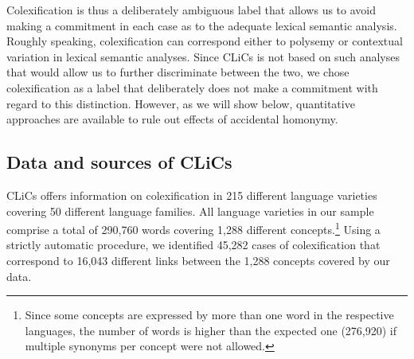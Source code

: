 Colexification is thus a deliberately ambiguous label that allows us to avoid making a commitment in
each case as to the adequate lexical semantic analysis.
Roughly speaking,
colexification can correspond either to polysemy or contextual variation in lexical semantic analyses.
Since CLiCs is not based on such analyses that would allow us to further discriminate between the
two, we chose colexification as a label that deliberately does not make a commitment with regard to
this distinction. However, as we will show below, quantitative approaches are available to rule out effects of accidental homonymy. 

\subsection{Data and sources of CLiCs}
CLiCs offers information on colexification in 215 different language varieties
covering 50 different language families. All language varieties in our sample comprise a total of
290,760 words covering 1,288 different concepts.\footnote{Since some concepts are expressed by more
than one word in the respective languages, the number of words is higher than the expected one
(276,920) if
multiple synonyms per concept were not allowed.} Using a strictly automatic procedure, we identified
45,282 cases of colexification that correspond to 16,043 different links between the 1,288 concepts
covered by our data. 


